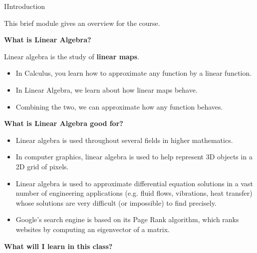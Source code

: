 \begin{module}{I}{Introduction}

\begin{remark}
  This brief module gives an overview for the course.
\end{remark}


\begin{applicationActivities}

\begin{remark} \textbf{What is Linear Algebra?}

  Linear algebra is the study of \textbf{linear maps}.

  \begin{itemize}
  \item In Calculus, you learn how to approximate any function by a
        linear function.
  \item In Linear Algebra, we learn about how linear maps behave.
  \item Combining the two, we can approximate how any function behaves.
  \end{itemize}
\end{remark}

\begin{remark} \textbf{What is Linear Algebra good for?}
  \begin{itemize}
  \item Linear algebra is used throughout several fields
        in higher mathematics.
  \item In computer graphics, linear algebra is used to help represent
        3D objects in a 2D grid of pixels.
  \item Linear algebra is used to approximate
        differential equation solutions in a vast number of engineering
        applications (e.g. fluid flows, vibrations, heat transfer) whose
        solutions are very difficult (or impossible) to find precisely.
  \item Google's search engine is based on its Page Rank algorithm, which
        ranks websites by computing an eigenvector of a matrix.
  \end{itemize}
\end{remark}

\begin{remark} \textbf{What will I learn in this class?}


\end{remark}
\end{applicationActivities}
\end{module}
